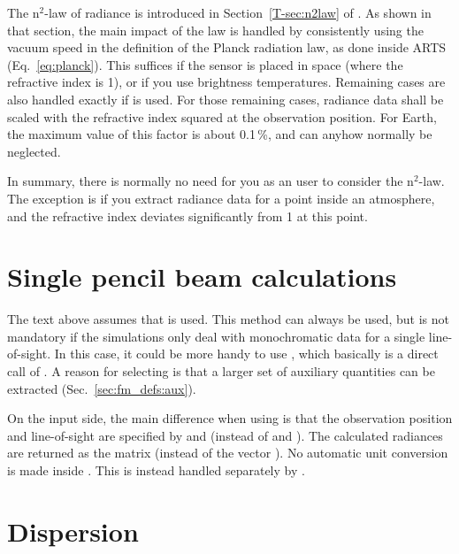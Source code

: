 The n$^2$-law of radiance is introduced in
Section~\ref{T-sec:n2law} of \theory. As shown in that section, the main impact
of the law is handled by consistently using the vacuum speed in the definition
of the Planck radiation law, as done inside ARTS (Eq.~\ref{eq:planck}). This
suffices if the sensor is placed in space (where the refractive index is 1), or
if you use brightness temperatures. Remaining cases are also handled exactly if
 is used. For those remaining cases, radiance
data shall be scaled with the refractive index squared at the observation
position. For Earth, the maximum value of this factor is about 0.1\,\%, and can
anyhow normally be neglected.

In summary, there is normally no need for you as an user to consider the
n$^2$-law. The exception is if you extract radiance data for a point inside an
atmosphere, and the refractive index deviates significantly from 1 at this
point.




\section{Single pencil beam calculations}
\label{sec:fm_defs:single_beams}

The text above assumes that  is used. This method can always be
used, but  is not mandatory if the simulations only deal with
monochromatic data for a single line-of-sight. In this case, it could be more
handy to use , which basically is a direct call of
. A reason for selecting  is that
a larger set of auxiliary quantities can be extracted
(Sec.~\ref{sec:fm_defs:aux}). 

On the input side, the main difference when using  is that
the observation position and line-of-sight are specified by 
and  (instead of  and
). The calculated radiances are returned as the matrix
 (instead of the vector ). 
No automatic unit conversion is made inside . This is
instead handled separately by .




\section{Dispersion}
\label{sec:fm_defs:dispersion}


